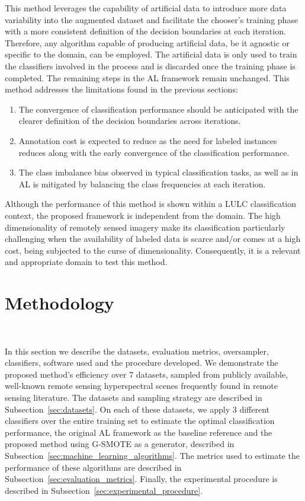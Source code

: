 \documentclass[remotesensing,article,submit,moreauthors,pdftex]{Definitions/mdpi}
\begin{document}
This method leverages the capability of artificial data to introduce more data
variability into the augmented dataset and facilitate the chooser's training
phase with a more consistent definition of the decision boundaries at each
iteration. Therefore, any algorithm capable of producing artificial data, be
it agnostic or specific to the domain, can be employed. The artificial data is
only used to train the classifiers involved in the process and is discarded
once the training phase is completed. The remaining steps in the AL framework
remain unchanged. This method addresses the limitations found in the previous
sections:

\begin{enumerate}
    \item The convergence of classification performance should be anticipated
        with the clearer definition of the decision boundaries across
        iterations.
    \item Annotation cost is expected to reduce as the need for labeled
        instances reduces along with the early convergence of the
        classification performance.
    \item The class imbalance bias observed in typical classification tasks, as
        well as in AL is mitigated by balancing the class frequencies at each
        iteration.
\end{enumerate}

Although the performance of this method is shown within a LULC classification
context, the proposed framework is independent from the domain. The high
dimensionality of remotely sensed imagery make its classification particularly
challenging when the availability of labeled data is scarce and/or comes at a
high cost, being subjected to the curse of dimensionality. Consequently, it is
a relevant and appropriate domain to test this method.


\section{Methodology}~\label{sec:methodology}

In this section we describe the datasets, evaluation metrics, oversampler,
classifiers, software used and the procedure developed. We demonstrate the
proposed method's efficiency over 7 datasets, sampled from publicly available,
well-known remote sensing hyperspectral scenes frequently found in remote
sensing literature. The datasets and sampling strategy are described in
Subsection~\ref{sec:datasets}. On each of these datasets, we apply 3 different
classifiers over the entire training set to estimate the optimal
classification performance, the original AL framework as the baseline
reference and the proposed method using G-SMOTE as a generator, described in
Subsection~\ref{sec:machine_learning_algorithms}. The metrics used to estimate
the performance of these algorithms are described in
Subsection~\ref{sec:evaluation_metrics}. Finally, the experimental procedure
is described in Subsection~\ref{sec:experimental_procedure}. 
\end{document}

